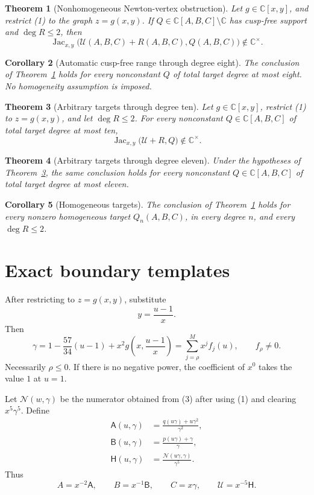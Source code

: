 \documentclass[11pt]{article}
\newtheorem{theorem}{Theorem}[section]
\newtheorem{corollary}[theorem]{Corollary}
\theoremstyle{remark}
\newcommand{\C}{\mathbb C}
\newcommand{\Jac}{\operatorname{Jac}}
\newcommand{\cU}{\mathcal U}
\begin{document}
\begin{theorem}[Nonhomogeneous Newton-vertex obstruction]
\label{thm:main}
Let \(g\in\C[x,y]\), and restrict (1) to the graph \(z=g(x,y)\).
If \(Q\in\C[A,B,C]\setminus\C\) has cusp-free support and
\(\deg R\le2\), then
\[
\Jac_{x,y}\bigl(\cU(A,B,C)+R(A,B,C),Q(A,B,C)\bigr)
\notin\C^\times .
\tag{4}
\]
\end{theorem}

\begin{corollary}[Automatic cusp-free range through degree eight]
\label{cor:eight}
The conclusion of Theorem~\ref{thm:main} holds for every nonconstant
\(Q\) of total target degree at most eight.  No homogeneity assumption
is imposed.
\end{corollary}

\begin{theorem}[Arbitrary targets through degree ten]
\label{thm:ten}
Let \(g\in\C[x,y]\), restrict (1) to \(z=g(x,y)\), and let
\(\deg R\le2\).  For every nonconstant \(Q\in\C[A,B,C]\) of total
target degree at most ten,
\[
\Jac_{x,y}\bigl(\cU+R,Q\bigr)\notin\C^\times .
\]
\end{theorem}

\begin{theorem}[Arbitrary targets through degree eleven]
\label{thm:eleven}
Under the hypotheses of Theorem~\ref{thm:ten}, the same conclusion holds
for every nonconstant \(Q\in\C[A,B,C]\) of total target degree at most
eleven.
\end{theorem}

\begin{corollary}[Homogeneous targets]
\label{cor:homogeneous}
The conclusion of Theorem~\ref{thm:main} holds for every nonzero
homogeneous target \(Q_n(A,B,C)\), in every degree \(n\), and every
\(\deg R\le2\).
\end{corollary}

\section{Exact boundary templates}

After restricting to \(z=g(x,y)\), substitute
\[
y=\frac{u-1}{x}.
\]
Then
\[
\gamma
=1-\frac{57}{34}(u-1)
 +x^2g\left(x,\frac{u-1}{x}\right)
=\sum_{j=\rho}^{M}x^jf_j(u),
\qquad f_\rho\ne0.
\tag{5}
\]
Necessarily \(\rho\le0\).  If there is no negative power, the
coefficient of \(x^0\) takes the value \(1\) at \(u=1\).

Let \(\mathcal N(w,\gamma)\) be the numerator obtained from (3) after
using (1) and clearing \(x^5\gamma^5\).  Define
\[
\begin{aligned}
\mathsf A(u,\gamma)
 &=\frac{q(u\gamma)+u\gamma^2}{\gamma^2},\\
\mathsf B(u,\gamma)
 &=\frac{p(u\gamma)+\gamma}{\gamma},\\
\mathsf H(u,\gamma)
 &=\frac{\mathcal N(u\gamma,\gamma)}{\gamma^5}.
\end{aligned}
\tag{6}
\]
Thus
\[
A=x^{-2}\mathsf A,\qquad
B=x^{-1}\mathsf B,\qquad
C=x\gamma,\qquad
\cU=x^{-5}\mathsf H.
\tag{7}
\]
\end{document}
